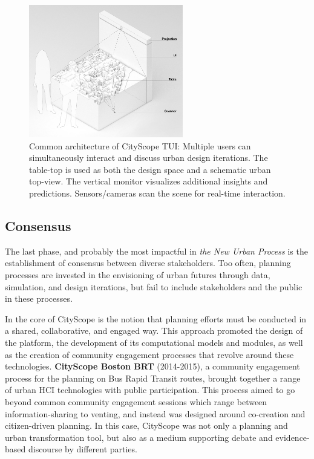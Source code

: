 \begin{figure}[t]
\begin{center}
    \includegraphics[width=0.6\textwidth]{figures/CityScope TUI.jpg}
\end{center}
   \caption{Common architecture of CityScope TUI: Multiple users can simultaneously interact and discuss urban design iterations. The table-top is used as both the design space and a schematic urban top-view. The vertical monitor visualizes additional insights and predictions. Sensors/cameras scan the scene for real-time interaction.}
\label{fig:CityScopeTUI}
\end{figure}


\subsection{Consensus}

{The last phase, and probably the most impactful in \textit{the New Urban Process} is the establishment of consensus between diverse stakeholders. Too often, planning processes are invested in the envisioning of urban futures through data, simulation, and design iterations, but fail to include stakeholders and the public in these processes.} 

{In the core of CityScope is the notion that planning efforts must be conducted in a shared, collaborative, and engaged way. This approach promoted the design of the platform, the development of its computational models and modules, as well as the creation of community engagement processes that revolve around these technologies. \textbf{CityScope Boston BRT} (2014-2015), a community engagement process for the planning on Bus Rapid Transit routes, brought together a range of urban HCI technologies with public participation. This process aimed to go beyond common community engagement sessions which range between information-sharing to venting, and instead was designed around co-creation and citizen-driven planning. In this case, CityScope was not only a planning and urban transformation tool, but also as a medium supporting debate and evidence-based discourse by different parties.}



